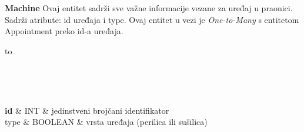 			
			\noindent\textbf{Machine}  Ovaj entitet sadrži sve važne informacije vezane za uređaj u praonici. Sadrži atribute: id uređaja i type. Ovaj entitet u vezi je \textit{One-to-Many} s entitetom Appointment preko id-a uređaja.
			
			\begin{longtabu} to \textwidth {|X[8, l]|X[6, l]|X[20, l]|}
				
				\hline {}	 \\[3pt] \hline
				\endfirsthead
				
				\hline {}	 \\[3pt] \hline
				\endhead
				
				\hline 
				\endlastfoot
				
				\textbf{id} & INT	&  jedinstveni brojčani identifikator	\\ \hline
				type & BOOLEAN &  vrsta uređaja (perilica ili sušilica)\\ \hline 
				
				
			\end{longtabu}
		
